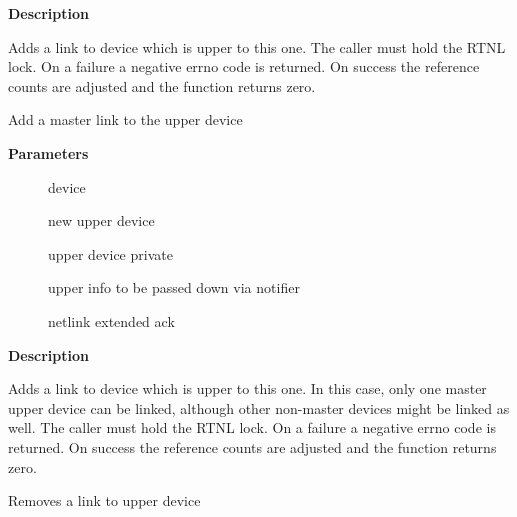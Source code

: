\documentclass[a4paper,8pt,english]{sphinxmanual}
\begin{document}
\textbf{Description}

Adds a link to device which is upper to this one. The caller must hold
the RTNL lock. On a failure a negative errno code is returned.
On success the reference counts are adjusted and the function
returns zero.

\begin{fulllineitems}
\label{networking/kapi:c.netdev_master_upper_dev_link}
Add a master link to the upper device

\end{fulllineitems}


\textbf{Parameters}
\begin{description}
\item[{}] \leavevmode
device

\item[{}] \leavevmode
new upper device

\item[{}] \leavevmode
upper device private

\item[{}] \leavevmode
upper info to be passed down via notifier

\item[{}] \leavevmode
netlink extended ack

\end{description}

\textbf{Description}

Adds a link to device which is upper to this one. In this case, only
one master upper device can be linked, although other non-master devices
might be linked as well. The caller must hold the RTNL lock.
On a failure a negative errno code is returned. On success the reference
counts are adjusted and the function returns zero.

\begin{fulllineitems}
\label{networking/kapi:c.netdev_upper_dev_unlink}
Removes a link to upper device

\end{fulllineitems}
\end{document}
